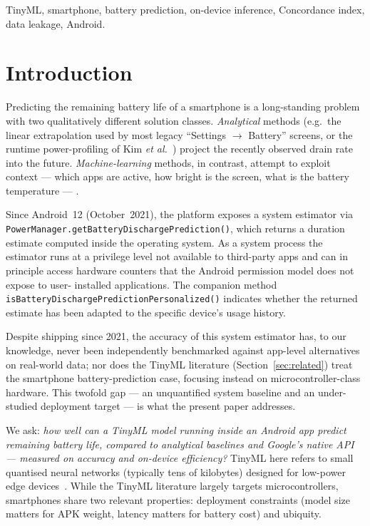 \documentclass[conference]{IEEEtran}
\begin{document}
\begin{IEEEkeywords}
TinyML, smartphone, battery prediction, on-device inference, Concordance
index, data leakage, Android.
\end{IEEEkeywords}

\section{Introduction}
Predicting the remaining battery life of a smartphone is a long-standing
problem~\cite{kim2016accurate,li2018predicting} with two qualitatively
different solution classes. \emph{Analytical}
methods (e.g.\ the linear extrapolation used by most legacy ``Settings
$\rightarrow$ Battery'' screens, or the runtime power-profiling of
Kim \emph{et al.}~\cite{kim2016accurate}) project the recently observed
drain rate into the future. \emph{Machine-learning} methods, in contrast,
attempt to exploit context --- which apps are active, how bright is the
screen, what is the battery temperature ---
\cite{li2018predicting,floresmartin2024enhancing}.

Since Android~12 (October~2021), the platform exposes a system
estimator via
\texttt{PowerManager.\allowbreak getBatteryDischargePrediction()}\cite{android2021powermanager},
which returns a duration estimate computed inside the operating system.
As a system process the estimator runs at a privilege level not
available to third-party apps and can in principle access hardware
counters that the Android permission model does not expose to user-%
installed applications. The companion method
\texttt{isBatteryDischargePredictionPersonalized()} indicates whether
the returned estimate has been adapted to the specific device's usage
history.

Despite shipping since 2021, the accuracy of this system estimator
has, to our knowledge, never been independently benchmarked against
app-level alternatives on real-world data; nor does the TinyML
literature (Section~\ref{sec:related}) treat the smartphone
battery-prediction case, focusing instead on microcontroller-class
hardware. This twofold gap --- an unquantified system baseline and an
under-studied deployment target --- is what the present paper
addresses.

We ask: \emph{how well can a TinyML model running inside an
Android app predict remaining battery life, compared to analytical
baselines and Google's native API --- measured on accuracy and
on-device efficiency?} TinyML here refers to small quantised neural
networks (typically tens of kilobytes) designed for low-power edge
devices~\cite{banbury2021mlperf}. While the TinyML literature largely
targets microcontrollers, smartphones share two relevant properties:
deployment constraints (model size matters for APK weight, latency
matters for battery cost) and ubiquity.
\end{document}
